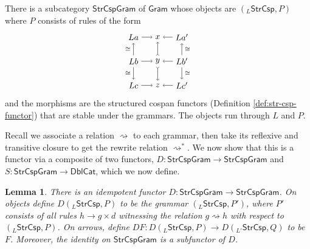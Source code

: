 \documentclass{amsart}
\newcommand{\iso}{\cong}
\newcommand{\DblCat}{\cat{DblCat}}
\newcommand{\Gram}{\cat{Gram}}
\newcommand{\StrCsp}{\cat{StrCsp}}
\newcommand{\StrCspGram}{\cat{StrCspGram}}
\newcommand{\cat}[1]{\mathsf{#1}}
\newcommand{\from}{\colon}
\newcommand{\dderiv}[2]{#1 \rightsquigarrow #2}
\newcommand{\spn}[3]{#2 \to #1 \times #3}
\newtheorem{lemma}[theorem]{Lemma}
\theoremstyle{remark}
\theoremstyle{definition}
\begin{document}
There is a subcategory $ \StrCspGram $ of $ \Gram $ whose
objects are $ ( _{L}\StrCsp , P ) $ where $ P $ consists of
rules of the form
 \[
   \begin{tikzpicture}
    \begin{scope}
        \node (1) at (0,2) {\( La \)};
        \node (2) at (1,2) {\( x \)};
        \node (3) at (2,2) {\( La' \)};
        \node (4) at (0,1) {\( Lb \)};
        \node (5) at (1,1) {\( y \)};
        \node (6) at (2,1) {\( Lb' \)};
        \node (7) at (0,0) {\( Lc \)};
        \node (8) at (1,0) {\( z \)};
        \node (9) at (2,0) {\( Lc' \)};
        \draw [->] (1) to node []
          {\scriptsize{\( \)}} (2);
        \draw [->] (3) to node []
          {\scriptsize{\( \)}} (2);
        \draw [->] (4) to node []
          {\scriptsize{\( \)}} (5);
        \draw [->] (6) to node []
          {\scriptsize{\( \)}} (5);
        \draw [->] (7) to node []
          {\scriptsize{\( \)}} (8);
        \draw [->] (9) to node []
          {\scriptsize{\( \)}} (8);
        \draw [->] (4) to node [left]
          {\scriptsize{\( \iso \)}} (1);
        \draw [->] (4) to node [left]
          {\scriptsize{\( \iso \)}} (7);
        \draw [>->] (5) to node []
          {\scriptsize{\( \)}} (2);
        \draw [>->] (5) to node []
          {\scriptsize{\( \)}} (8);
        \draw [->] (6) to node [right]
          {\scriptsize{\( \iso \)}} (3);
        \draw [->] (6) to node [right]
          {\scriptsize{\( \iso \)}} (9);
    \end{scope}
  \end{tikzpicture}
\]
%
and the morphisms are the structured cospan functors
(Definition \ref{def:str-csp-functor}) that are stable under
the grammars. The objects run through $ L $ and $ P $.

Recall we associate a relation $ \rightsquigarrow $ to each
grammar, then take its reflexive and transitive closure to
get the rewrite relation $ \rightsquigarrow^\ast $. We now
show that this is a functor via a composite of
two functors, $ D \from \StrCspGram \to \StrCspGram $ and
$ S \from \StrCspGram \to \DblCat $, which we now define.

\begin{lemma}
  There is an idempotent functor
  $ D \from \StrCspGram \to \StrCspGram $. On
  objects define $ D ( _{L}\StrCsp , P ) $ to be the
  grammar $ ( _{L}\StrCsp , P') $, where $ P' $ consists of
  all rules $ \spn{g}{h}{d} $ witnessing the relation
  $ \dderiv{g}{h} $ with respect to $ ( _{L}\StrCsp , P )
  $. On arrows, define
  $ DF \from D( _{L}\StrCsp , P ) \to D( _{L'}\StrCsp , Q )
  $ to be $ F $.  Moreover, the identity on
  $ \StrCspGram $ is a subfunctor of $ D $.
\end{lemma}
\end{document}
